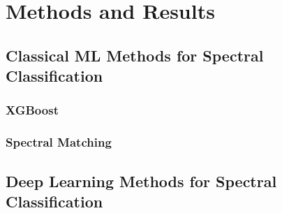 \section{Methods and Results}










\subsection{Classical ML Methods for Spectral Classification}




\subsubsection{XGBoost}
\subsubsection{Spectral Matching}


\subsection{Deep Learning Methods for Spectral Classification}


